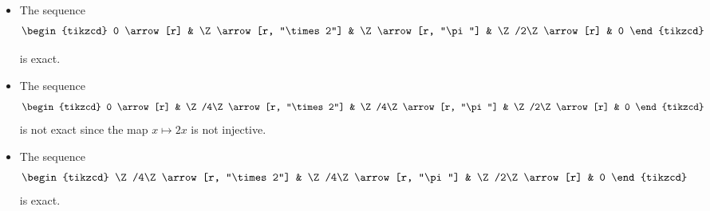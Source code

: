 \documentclass[main.tex]{subfiles}
\begin{document}
\begin{example}
  \leavevmode
  \begin{itemize}
    \item The sequence
      \begin{equation*}
        \begin{tikzcd}
          0
          \arrow[r]
          & \Z
          \arrow[r, "\times 2"]
          & \Z
          \arrow[r, "\pi"]
          & \Z/2\Z
          \arrow[r]
          & 0
        \end{tikzcd}
      \end{equation*}

      is exact.

    \item The sequence
      \begin{equation*}
        \begin{tikzcd}
          0
          \arrow[r]
          & \Z/4\Z
          \arrow[r, "\times 2"]
          & \Z/4\Z
          \arrow[r, "\pi"]
          & \Z/2\Z
          \arrow[r]
          & 0
        \end{tikzcd}
      \end{equation*}
      is not exact since the map $x \mapsto 2x$ is not injective.

    \item The sequence
      \begin{equation*}
        \begin{tikzcd}
          \Z/4\Z
          \arrow[r, "\times 2"]
          & \Z/4\Z
          \arrow[r, "\pi"]
          & \Z/2\Z
          \arrow[r]
          & 0
        \end{tikzcd}
      \end{equation*}
      is exact.
  \end{itemize}
\end{example}
\end{document}
